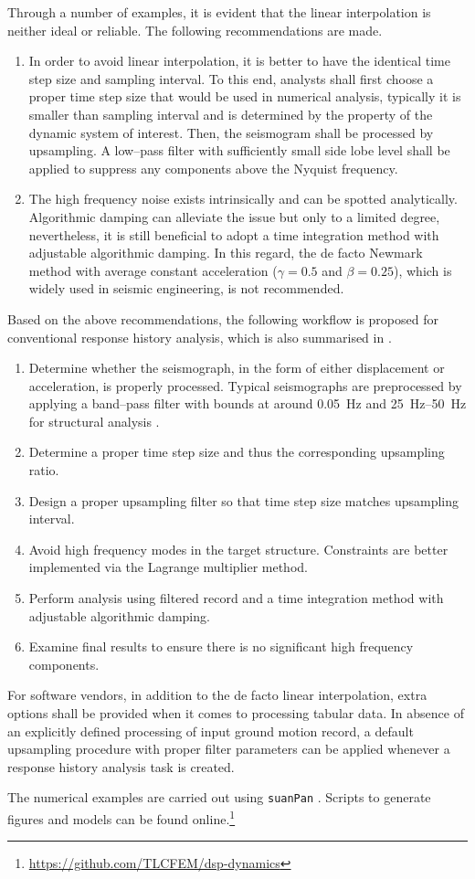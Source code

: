 Through a number of examples, it is evident that the linear interpolation is neither ideal or reliable. The following recommendations are made.
\begin{enumerate}
\item In order to avoid linear interpolation, it is better to have the identical time step size and sampling interval. To this end, analysts shall first choose a proper time step size that would be used in numerical analysis, typically it is smaller than sampling interval and is determined by the property of the dynamic system of interest. Then, the seismogram shall be processed by upsampling. A low--pass filter with sufficiently small side lobe level shall be applied to suppress any components above the Nyquist frequency.
\item The high frequency noise exists intrinsically and can be spotted analytically. Algorithmic damping can alleviate the issue but only to a limited degree, nevertheless, it is still beneficial to adopt a time integration method with adjustable algorithmic damping. In this regard, the de facto Newmark method with average constant acceleration ($\gamma=0.5$ and $\beta=0.25$), which is widely used in seismic engineering, is not recommended.
\end{enumerate}

Based on the above recommendations, the following workflow is proposed for conventional response history analysis, which is also summarised in .
\begin{enumerate}
\item Determine whether the seismograph, in the form of either displacement or acceleration, is properly processed. Typical seismographs are preprocessed by applying a band--pass filter with bounds at around \SI{0.05}{\hertz} and \SIrange{25}{50}{\hertz} for structural analysis \citep[see, e.g.,][]{Houtte2017}.
\item Determine a proper time step size and thus the corresponding upsampling ratio.
\item Design a proper upsampling filter so that time step size matches upsampling interval.
\item Avoid high frequency modes in the target structure. Constraints are better implemented via the Lagrange multiplier method.
\item Perform analysis using filtered record and a time integration method with adjustable algorithmic damping.
\item Examine final results to ensure there is no significant high frequency components.
\end{enumerate}

For software vendors, in addition to the de facto linear interpolation, extra options shall be provided when it comes to processing tabular data. In absence of an explicitly defined processing of input ground motion record, a default upsampling procedure with proper filter parameters can be applied whenever a response history analysis task is created.

The numerical examples are carried out using \texttt{suanPan} \citep{Chang2022}. Scripts to generate figures and models can be found online.\footnote{\url{https://github.com/TLCFEM/dsp-dynamics}}